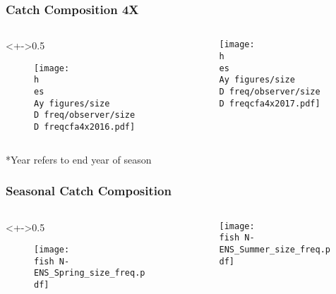 \documentclass{beamer}
\newcommand{\D}{.} %
\newcommand{\h}{C:/} %
\newcommand{\es}{bio.data/bio.snowcrab/}
\newcommand{\Ay}{assessments/2017/}
\newcommand{\fish}{C:/Rsaves/fishery/2017/}
\begin{document}

\begin{frame}
\frametitle{Catch Composition 4X}

\begin{columns}
\begin{column}<+->{0.5\textwidth}
 \vspace*{-0.5cm}
\begin{figure}
\centerline{\texttt{[image: \\h \\es \\Ay figures/size\\D freq/observer/size\\D freqcfa4x2016.pdf]}}

\end{figure}
\end{column}

\begin{column}{0.5\textwidth}
\begin{figure}
 \vspace*{-0.5cm}

\centerline{\texttt{[image: \\h \\es \\Ay figures/size\\D freq/observer/size\\D freqcfa4x2017.pdf]}}

 \end{figure}

\end{column}
\end{columns}
*Year refers to end year of season

\end{frame}


\begin{frame}
\frametitle{Seasonal Catch Composition}

\begin{columns}
\begin{column}<+->{0.5\textwidth}
 \vspace*{-0.5cm}
\begin{figure}
\centerline{\texttt{[image: \\fish N-ENS\_Spring\_size\_freq.pdf]}}

\end{figure}
\end{column}

\begin{column}{0.5\textwidth}
\begin{figure}
 \vspace*{-0.5cm}

\centerline{\texttt{[image: \\fish N-ENS\_Summer\_size\_freq.pdf]}}

 \end{figure}

\end{column}
\end{columns}


\end{frame}
\end{document}
